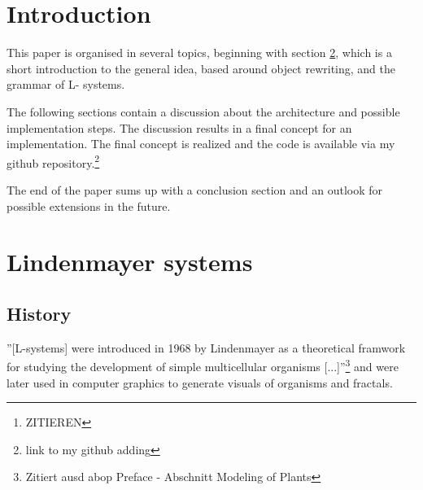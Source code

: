 \documentclass[english]{cpp-hmwk}
\begin{document}

\begin{abstract}
Lindenmayer Systems, short L-systems, are the result of \textbf{research from Lindenmayer et al.}\footnote{ZITIEREN} about the geometric features of plants.
L-systems are a concept to mathematicaly/formal describe and model the growth processes of plant development. They are not only restricted to the plant based developments, but can also be used to generate fractals.

L-systems have an inital state and use rules, like a formal grammar, to transform or rather rewrite the current state to create the next state of the development from a plant or a fractal.
It is therefore possible to successive calculate each state of the development.
Such a state of a L-system can be interpreted as commands for a turtle graphic, which creates the opportunity to draw the created fractals or plant states. 

Goal of this paper is to design an architecture for L-systems, which includes an implementation for L-systems, their creation and an interface for a turtle graphic. The interface should enable the polymorphic use of different turtle graphic implementations and enable drawing of the L-system state.
\end{abstract}

\pagebreak
\section{Introduction}
This paper is organised in several topics, beginning with section \ref{section:lindenmayer}, which is a short introduction to the general idea,  based around object rewriting, and the grammar of L- systems.

The following sections contain a discussion about the architecture and possible implementation steps. The discussion results in a final concept for an implementation.
The final concept is realized and the code is available via my github repository.\footnote{link to my github adding}

The end of the paper sums up with a conclusion section and an outlook for possible extensions in the future.

\section{Lindenmayer systems}
\label{section:lindenmayer}
\subsection{History}
\label{section:history}
''[L-systems] were introduced in 1968 by Lindenmayer as a theoretical framwork for studying the development of simple multicellular organisms [...]''\footnote{Zitiert ausd abop Preface - Abschnitt Modeling of Plants} and were later used in computer graphics to generate visuals of organisms and fractals.
\end{document}
